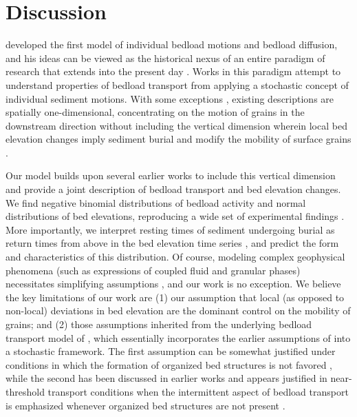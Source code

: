 \documentclass[draft]{agujournal2018}
\begin{document}
\section{Discussion}

\citet{Einstein1937} developed the first model of individual bedload motions and bedload diffusion, and his ideas can be viewed as the historical nexus of an entire paradigm of research that extends into the present day \citep[e.g.][]{Hubbell1964, Nakagawa1976,Hassan1991,Ancey2008, Wu2019}.
Works in this paradigm attempt to understand properties of bedload transport from applying a stochastic concept of individual sediment motions.
With some exceptions \citep[e.g.][]{Yang1971,Nakagawa1980,Pelosi2016,Wu2019}, existing descriptions are spatially one-dimensional, concentrating on the motion of grains in the downstream direction without including the vertical dimension wherein local bed elevation changes imply sediment burial \citep[e.g.][]{Voepel2013,Martin2014} and modify the mobility of surface grains \citep[e.g.][]{Yang1971,Nakagawa1980}.

Our model builds upon several earlier works \citep[e.g.][]{Ancey2008,Martin2014} to include this vertical dimension and provide a joint description of bedload transport and bed elevation changes.
We find negative binomial distributions of bedload activity and normal distributions of bed elevations, reproducing a wide set of experimental findings \citep{Ancey2008, Heyman2016, Wong2007, Singh2009, Martin2014}.
More importantly, we interpret resting times of sediment undergoing burial as return times from above in the bed elevation time series \citep[e.g.][]{Voepel2013,Martin2014}, and predict the form and characteristics of this distribution.
Of course, modeling complex geophysical phenomena (such as expressions of coupled fluid and granular phases) necessitates simplifying assumptions \citep[e.g.][]{Larsen2016}, and our work is no exception.
We believe the key limitations of our work are (1) our assumption that local (as opposed to non-local) deviations in bed elevation are the dominant control on the mobility of grains; and (2) those assumptions inherited from the underlying bedload transport model of \citet{Ancey2008}, which essentially incorporates the earlier assumptions of \citet{Einstein1950} into a stochastic framework.
The first assumption can be somewhat justified under conditions in which the formation of organized bed structures is not favored \citep[e.g.][]{Hassan2008}, while the second has been discussed in earlier works and appears justified in near-threshold transport conditions when the intermittent aspect of bedload transport is emphasized \citep[e.g.][]{Ancey2008,Heyman2014} whenever organized bed structures are not present \citep[e.g.][]{Dhont2018}.
\end{document}
